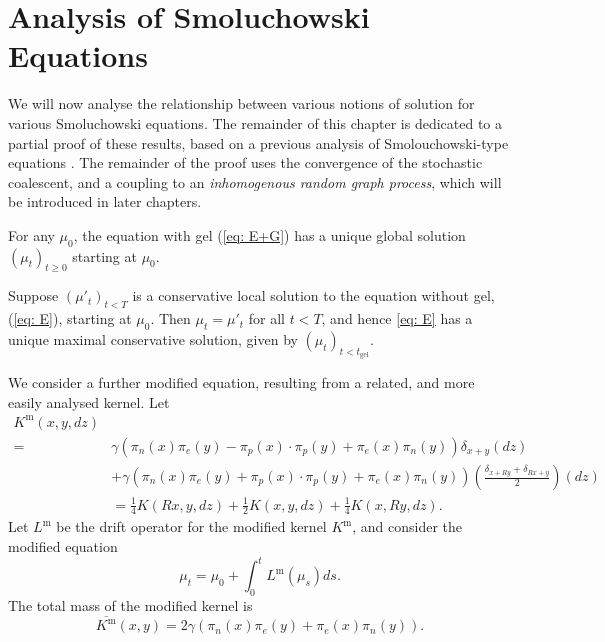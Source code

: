 \section{Analysis of Smoluchowski Equations}We will now analyse the relationship between various notions of solution for various Smoluchowski equations.  The remainder of this chapter is dedicated to a partial proof of these results, based on a previous analysis of Smolouchowski-type equations \cite{N00}. The remainder of the proof uses the convergence of the stochastic coalescent, and a coupling to an \emph{inhomogenous random graph process}, which will be introduced in later chapters.  
\begin{lemma} \label{lemma: E and U} For any $\mu_0$, the equation with gel (\ref{eq: E+G}) has a unique global solution $(\mu_t)_{t\geq 0}$ starting at $\mu_0$.  \end{lemma} \begin{corollary}\label{cor: maximal conservative solutions} Suppose $(\mu'_t)_{t<T}$ is a conservative local solution to the equation without gel, (\ref{eq: E}), starting at $\mu_0$. Then $\mu_t=\mu'_t$ for all $t<T$, and hence \ref{eq: E} has a unique maximal conservative solution, given by $(\mu_t)_{t<t_\text{gel}}$.\end{corollary}  We consider a further modified equation, resulting from a related, and more easily analysed kernel. Let \begin{equation}
    \label{eq: modified K} \begin{split} K^\text{m}(x,y,dz)& \\  = & \gamma(\pi_n(x)\pi_e(y)-\pi_p(x)\cdot \pi_p(y)+ \pi_e(x)\pi_n(y))\delta_{x+y}(dz) \\ & + \gamma(\pi_n(x)\pi_e(y)+\pi_p(x)\cdot \pi_p(y)+ \pi_e(x)\pi_n(y))\left(\frac{\delta_{x+Ry}+\delta_{Rx+y}}{2}\right)(dz) \\ & =\frac{1}{4}K(Rx, y, dz)+\frac{1}{2}K(x,y,dz)+\frac{1}{4}K(x,Ry, dz). \end{split} 
\end{equation} Let $L^\text{m}$ be the drift operator for the modified kernel $K^\text{m}$, and consider the modified equation \begin{equation} \label{eq: mE}
    \mu_t=\mu_0+\int_0^t L^\text{m}(\mu_s)ds.
\end{equation}The total mass of the modified kernel is \begin{equation}
    \label{eq: modified Kbar} \overline{K^\text{m}}(x,y)=2\gamma(\pi_n(x)\pi_e(y)+\pi_e(x)\pi_n(y)).
\end{equation}
